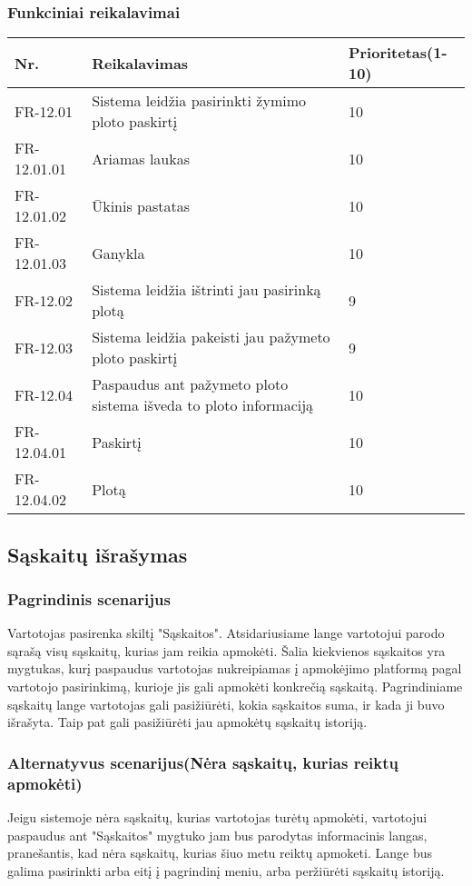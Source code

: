\documentclass[oneside]{VUMIFPSkursinis}
\begin{document}
	\subsubsection{Funkciniai reikalavimai}
	\begin{table}[htbp]
		\begin{tabularx}{1\textwidth}{ |P{2.5cm}|X|P{3cm }| }  \hline
			Nr. & Reikalavimas & Prioritetas(1-10) \\ \hline
			FR-12.01 & Sistema leidžia pasirinkti žymimo ploto paskirtį & 10 \\ \hline
			FR-12.01.01 & Ariamas laukas & 10 \\ \hline
			FR-12.01.02 & Ūkinis pastatas & 10 \\ \hline
			FR-12.01.03 & Ganykla & 10 \\ \hline
			FR-12.02 & Sistema leidžia ištrinti jau pasirinką plotą & 9 \\ \hline
			FR-12.03 & Sistema leidžia pakeisti jau pažymeto ploto paskirtį & 9 \\ \hline
			FR-12.04 & Paspaudus ant pažymeto ploto sistema išveda to ploto informaciją & 10 \\ \hline
			FR-12.04.01 & Paskirtį & 10 \\ \hline
			FR-12.04.02 & Plotą & 10 \\ \hline			
		\end{tabularx}
	\end{table}
\subsection{Sąskaitų išrašymas}
	\subsubsection{Pagrindinis scenarijus}
	Vartotojas pasirenka skiltį "Sąskaitos". Atsidariusiame lange vartotojui parodo sąrašą visų sąskaitų, kurias jam reikia apmokėti. Šalia kiekvienos sąskaitos yra mygtukas, kurį paspaudus vartotojas nukreipiamas į apmokėjimo platformą pagal vartotojo pasirinkimą, kurioje jis gali apmokėti konkrečią sąskaitą. Pagrindiniame sąskaitų lange vartotojas gali pasižiūrėti, kokia sąskaitos suma, ir kada ji buvo išrašyta. Taip pat gali pasižiūrėti jau apmokėtų sąskaitų istoriją.
	\subsubsection{Alternatyvus scenarijus(Nėra sąskaitų, kurias reiktų apmokėti)}
	Jeigu sistemoje nėra sąskaitų, kurias vartotojas turėtų apmokėti, vartotojui paspaudus ant "Sąskaitos" mygtuko jam bus parodytas informacinis langas, pranešantis, kad nėra sąskaitų, kurias šiuo metu reiktų apmoketi. Lange bus galima pasirinkti arba eitį į pagrindinį meniu, arba peržiūrėti sąskaitų istoriją.
\end{document}
